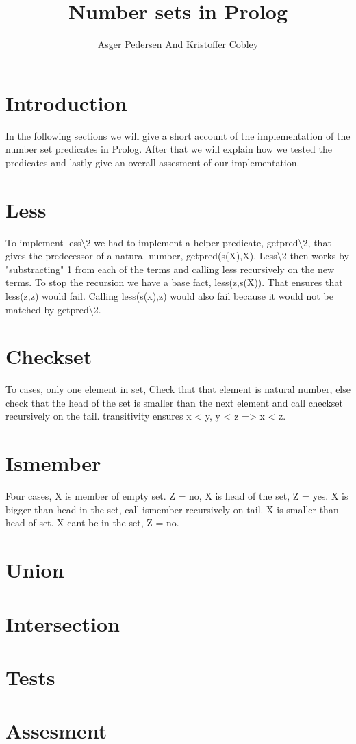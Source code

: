 \documentclass[]{article}
\title{Number sets in Prolog}
\author{ Asger Pedersen And Kristoffer Cobley}
\begin{document}
\ifpdf
{}
\else
{}
\fi

\maketitle
\setcounter{tocdepth}{1}
\tableofcontents
\newpage
\section{Introduction} %
\label{sec:introduction}
In the following sections we will give a short account of the implementation of the number set predicates in Prolog. After that we will explain how we tested the predicates and lastly give an overall assesment of our implementation.
\section{Less} %
\label{sec:less}
To implement less\textbackslash2 we had to implement a helper predicate, getpred\textbackslash2, that gives the predecessor of a natural number, getpred(s(X),X). Less\textbackslash2 then works by "substracting" 1 from each of the terms and calling less recursively on the new terms. To stop the recursion we have a base fact, less(z,s(X)). That ensures that less(z,z) would fail. Calling less(s(x),z) would also fail because it would not be matched by getpred\textbackslash2.
\section{Checkset} %
\label{sec:checkset}
To cases, only one element in set, Check that that element is natural number, else check that the head of the set is smaller than the next element and call checkset recursively on the tail. transitivity ensures x < y, y < z => x < z.
\section{Ismember} %
\label{sec:ismember}
Four cases, X is member of empty set. Z = no,
X is head of the set, Z = yes.
X is bigger than  head in the set, call ismember recursively on tail.
X is smaller than head of set. X cant be in the set, Z = no.
\section{Union} %
\label{sec:union}

\section{Intersection} %
\label{sec:intersection}

\section{Tests} %
\label{sec:tests}

\section{Assesment} %
\label{sec:assesment}



\end{document}
